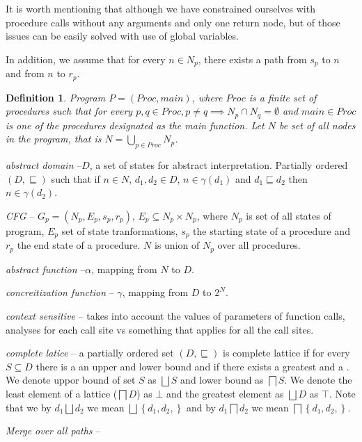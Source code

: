\documentclass[..thesis.tex]{subfiles}
\newtheorem{defin}{Definition}[section]
\begin{document}
It is worth mentioning that although we have constrained ourselves with procedure calls without any arguments and only one return node, 
but of those issues can be easily solved with use of global variables. 

In addition, we assume that for every $n \in N_p$, there exists a path from $s_p$ to $n$ and from $n$ to $r_p$.    

\begin{defin}
Program $P = \left( Proc, main \right)$, where $Proc$ is a finite set of procedures such that for every $p,q \in Proc, p \neq q \implies N_p \cap N_q = \emptyset$ and $main \in Proc$ is one of the procedures designated as the main function. Let $N$ be set of all nodes in the program, that is $N = \bigcup_{p \in Proc}N_p$. 
\end{defin}












  


\textit{abstract domain} --$D$,  a set of states for abstract interpretation. Partially ordered $\left(D,\sqsubseteq \right)$ such that if $n \in N$, $d_1,d_2 \in D$,  $n \in \gamma \left(d_1 \right) $ and $d_1 \sqsubseteq d_2$ then $n \in \gamma \left(d_2 \right)$.

\textit{CFG} -- $G_p=\left(N_p,E_p,s_p,r_p\right)$, $E_p \subseteq N_p \times N_p$, where $N_p$ is set of all states of program, $E_p$ set of state tranformations, $s_p$ the starting state of a procedure and $r_p$ the end state of a procedure. $N$ is union of $N_p$ over all procedures.

\textit{abstract function} --$\alpha$,  mapping from $N$ to $D$.

\textit{concreitization function} -- $\gamma$, mapping from $D$ to $2^N$.


\textit{context sensitive} -- takes into account the values of parameters of function calls, analyses for each call site vs something that applies for all the call sites.

\textit{complete latice} -- a partially ordered set $\left( D,\sqsubseteq \right)$ is complete lattice if for every $S \subseteq D$ there is a an upper and lower bound and if there exists a greatest and a . We denote uppor bound of set $S$ as $\bigsqcup S $ and lower bound as $\bigsqcap S$. We denote the least element of a lattice ($\bigsqcap D$) as $\bot$ and the greatest element as $\bigsqcup D$ as $\top$. Note that we by $d_1 \bigsqcup d_2$ we mean  $\bigsqcup \left\lbrace d_1, d_2, \right\rbrace $   and by $ d_1 \bigsqcap d_2$ we mean $\bigsqcap \left\lbrace d_1, d_2, \right\rbrace $.

 

\textit{Merge over all paths} -- 
\end{document}
